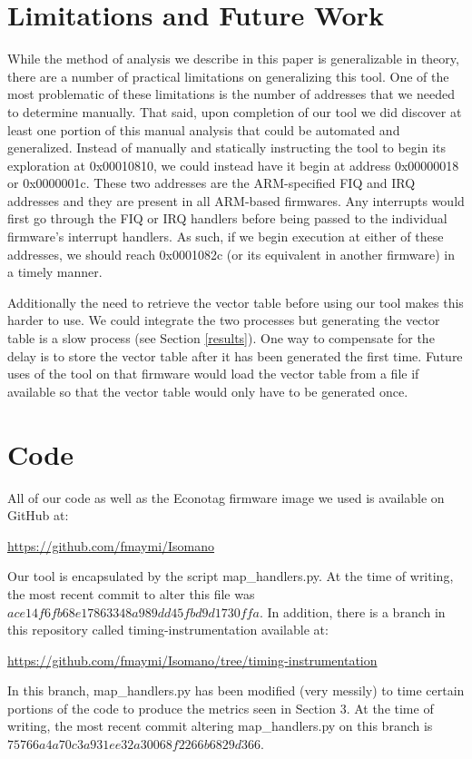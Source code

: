 \documentclass[letterpaper, 11 pt, conference]{ieeeconf}
\begin{document}
\section{Limitations and Future Work} \label{limits}
While the method of analysis we describe in this paper is generalizable in theory, there are a number of practical limitations on generalizing this tool. One of the most problematic of these limitations is the number of addresses that we needed to determine manually. That said, upon completion of our tool we did discover at least one portion of this manual analysis that could be automated and generalized. Instead of manually and statically instructing the tool to begin its exploration at 0x00010810, we could instead have it begin at address 0x00000018 or 0x0000001c. These two addresses are the ARM-specified FIQ and IRQ addresses and they are present in all ARM-based firmwares. Any interrupts would first go through the FIQ or IRQ handlers before being passed to the individual firmware’s interrupt handlers. As such, if we begin execution at either of these addresses, we should reach 0x0001082c (or its equivalent in another firmware) in a timely manner. 

Additionally the need to retrieve the vector table before using our tool makes this harder to use. We could integrate the two processes but generating the vector table is a slow process (see Section \ref{results}). One way to compensate for the delay is to store the vector table after it has been generated the first time. Future uses of the tool on that firmware would load the vector table from a file if available so that the vector table would only have to be generated once.

\section{Code}
All of our code as well as the Econotag firmware image we used is available on GitHub at:

\url{https://github.com/fmaymi/Isomano}

Our tool is encapsulated by the script map\_handlers.py. At the time of writing, the most recent commit to alter this file was $ace14f6fb68e17863348a989dd45fbd9d1730ffa$. In addition, there is a branch in this repository called timing-instrumentation available at: 

\url{https://github.com/fmaymi/Isomano/tree/timing-instrumentation}

In this branch, map\_handlers.py has been modified (very messily) to time certain portions of the code to produce the metrics seen in Section 3. At the time of writing, the most recent commit altering map\_handlers.py on this branch is $75766a4a70c3a931ee32a30068f2266b6829d366$.
\end{document}
